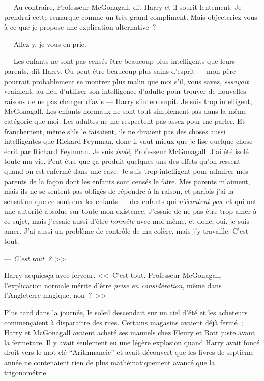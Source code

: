 --- Au contraire, Professeur McGonagall, dit Harry et il sourit lentement. Je prendrai cette remarque comme un très grand compliment. Mais objecteriez-vous à ce que je propose une explication alternative~?

--- Allez-y, je vous en prie.

--- Les enfants ne sont pas censés être beaucoup plus intelligents que leurs parents, dit Harry. Ou peut-être beaucoup plus sains d'esprit — mon père pourrait probablement se montrer plus malin que moi s'il, vous savez, \emph{essayait} vraiment, au lieu d'utiliser son intelligence d'adulte pour trouver de nouvelles raisons de ne pas changer d'avis — Harry s'interrompit. Je suis trop intelligent, McGonagall. Les enfants normaux ne sont tout simplement pas dans la même catégorie que moi. Les adultes ne me respectent pas assez pour me parler. Et franchement, même s'ils le faisaient, ils ne diraient pas des choses aussi intelligentes que Richard Feynman, donc il vaut mieux que je lise quelque chose écrit par Richard Feynman. Je suis \emph{isolé}, Professeur McGonagall. J'ai été isolé toute ma vie. Peut-être que ça produit quelques-uns des effets qu'on ressent quand on est enfermé dans une cave. Je suis trop intelligent pour admirer mes parents de la façon dont les enfants sont censés le faire. Mes parents m'aiment, mais ils ne se sentent pas obligés de répondre à la raison, et parfois j'ai la sensation que ce sont eux les enfants — des enfants qui \emph{n'écoutent pas}, et qui ont une autorité absolue sur toute mon existence. J'essaie de ne pas être trop amer à ce sujet, mais j'essaie aussi d'être \emph{honnête} avec moi-même, et donc, oui, je suis amer. J'ai aussi un problème de contrôle de ma colère, mais j'y travaille. C'est tout.

--- \emph{C'est tout~?}~>>

Harry acquiesça avec ferveur. <<~C'est tout. Professeur McGonagall, l'explication normale mérite d'être \emph{prise en considération}, même dans l'Angleterre magique, non~?~>>

\later

Plus tard dans la journée, le soleil descendait sur un ciel d'été et les acheteurs commençaient à disparaître des rues. Certains magasins avaient déjà fermé~; Harry et McGonagall avaient acheté ses manuels chez Fleury et Bott juste avant la fermeture. Il y avait seulement eu une légère explosion quand Harry avait foncé droit vers le mot-clé “Arithmancie” et avait découvert que les livres de septième année ne contenaient rien de plus mathématiquement avancé que la trigonométrie.

